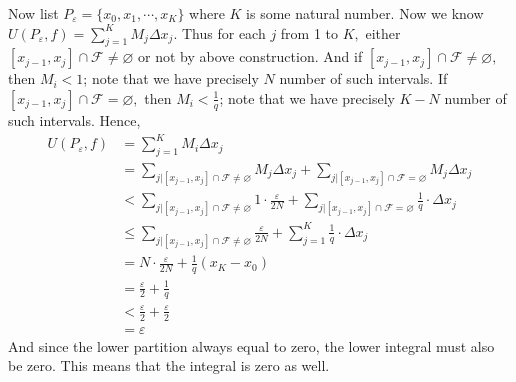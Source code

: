 \documentclass[12pt]{article}
\begin{document}
\begin{fproof}[5]
  Now list \(P_{\varepsilon} = \{x_0, x_1, \cdots, x_K\}\) where \(K\) is some natural number.
  Now we know \(U(P_{\varepsilon}, f) = \sum_{j=1}^{K} M_j \Delta x_j.\)
  Thus for each \(j\) from 1 to \(K,\) either \([x_{j-1}, x_j] \cap \mathcal{F} \neq \varnothing\) or not by above construction. And if \([x_{j-1}, x_j] \cap \mathcal{F} \neq \varnothing,\) then \(M_i < 1\); note that we have precisely \(N\) number of such intervals. If \([x_{j-1}, x_j] \cap \mathcal{F} = \varnothing,\) then \(M_i < \frac{1}{q}\); note that we have precisely \(K-N\) number of such intervals.
  Hence,
  \begin{align*}
    U(P_{\varepsilon}, f) &= \sum_{j=1}^{K} M_i \Delta x_j\\
    &= \sum_{j | [x_{j-1}, x_j] \cap \mathcal{F} \neq \varnothing} M_j \Delta x_j + \sum_{j | [x_{j-1}, x_j] \cap \mathcal{F} = \varnothing} M_j \Delta x_j\\
    &< \sum_{j | [x_{j-1}, x_j] \cap \mathcal{F} \neq \varnothing} 1 \cdot \frac{\varepsilon}{2N} + \sum_{j | [x_{j-1}, x_j] \cap \mathcal{F} = \varnothing} \frac{1}{q} \cdot \Delta x_j\\
    &\leq \sum_{j | [x_{j-1}, x_j] \cap \mathcal{F} \neq \varnothing} \frac{\varepsilon}{2N} + \sum_{j=1}^{K} \frac{1}{q} \cdot \Delta x_j\\
    & = N \cdot \frac{\varepsilon}{2N} + \frac{1}{q} (x_K - x_0)\\
    & = \frac{\varepsilon}{2} + \frac{1}{q}\\
    &< \frac{\varepsilon}{2} +\frac{\varepsilon}{2}\\
    & = \varepsilon
  \end{align*}
  And since the lower partition always equal to zero, the lower integral must also be zero. This means that the integral is zero as well. 
\end{fproof}
\end{document}
